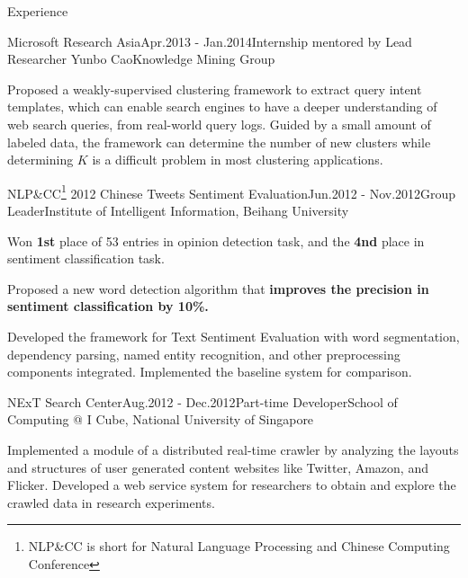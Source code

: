 \documentclass{resume} %
\begin{document}
\begin{rSection}{Experience}

\begin{rSubsection}{Microsoft Research Asia}{Apr.2013 - Jan.2014}{Internship mentored by Lead Researcher Yunbo Cao}{Knowledge Mining Group}
\item Proposed a weakly-supervised clustering framework to extract query intent templates, which can enable search engines to have a deeper understanding of web search queries, from real-world query logs. Guided by a small amount of labeled data, the framework can determine the number of new clusters while determining $K$ is a difficult problem in most clustering applications.
\end{rSubsection}

\begin{rSubsection}{NLP\&CC\footnote{NLP\&CC is short for Natural Language Processing and Chinese Computing Conference} 2012 Chinese Tweets Sentiment Evaluation}{Jun.2012 - Nov.2012}{Group Leader}{Institute of Intelligent Information, Beihang University}
\item Won \textbf{1st} place of 53 entries in opinion detection task, and the \textbf{4nd} place in sentiment classification task.
\item Proposed a new word detection algorithm that \textbf{improves the precision in sentiment classification by 10\%.}
\item Developed the framework for Text Sentiment Evaluation with word segmentation, dependency parsing, named entity recognition, and other preprocessing components integrated.  Implemented the baseline system for comparison.
\end{rSubsection}


\begin{rSubsection}{NExT Search Center}{Aug.2012 - Dec.2012}{Part-time Developer}{School of Computing @ I Cube, National University of Singapore}
\item Implemented a module of a distributed real-time crawler by analyzing the layouts and structures of user generated content websites like Twitter, Amazon, and Flicker.  Developed a web service system for researchers to obtain and explore the crawled data in research experiments.
\end{rSubsection}



\end{rSection}
\end{document}

